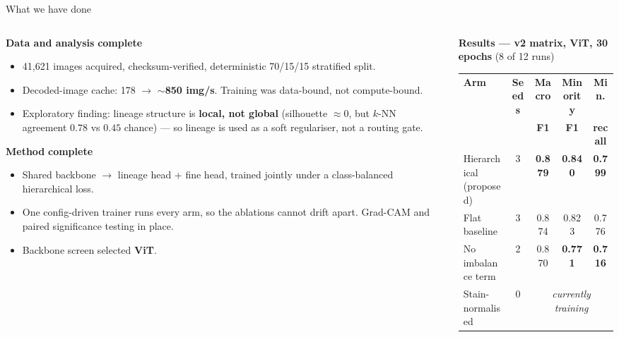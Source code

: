 \documentclass[aspectratio=169,11pt]{beamer}
\newcommand{\good}[1]{\textcolor{green!45!black}{\textbf{#1}}}
\newcommand{\bad}[1]{\textcolor{red!70!black}{\textbf{#1}}}
\begin{document}
\begin{frame}{What we have done}
  \begin{columns}[T]
    \begin{column}{0.47\textwidth}
      \scriptsize
      \textbf{Data and analysis} \good{complete}
      \begin{itemize}\setlength{\itemsep}{0.15em}
        \item 41,621 images acquired, checksum-verified, deterministic
          70/15/15 stratified split.
        \item Decoded-image cache: 178 $\rightarrow$ \good{$\sim$850 img/s}.
          Training was data-bound, not compute-bound.
        \item Exploratory finding: lineage structure is \textbf{local, not
          global} (silhouette $\approx 0$, but $k$-NN agreement $0.78$ vs
          $0.45$ chance) --- so lineage is used as a soft regulariser, not a
          routing gate.
      \end{itemize}

      \smallskip
      \textbf{Method} \good{complete}
      \begin{itemize}\setlength{\itemsep}{0.15em}
        \item Shared backbone $\rightarrow$ lineage head + fine head, trained
          jointly under a class-balanced hierarchical loss.
        \item One config-driven trainer runs every arm, so the ablations cannot
          drift apart. Grad-CAM and paired significance testing in place.
        \item Backbone screen selected \textbf{ViT}.
      \end{itemize}
    \end{column}
    \begin{column}{0.51\textwidth}
      \scriptsize
      \textbf{Results --- v2 matrix, ViT, 30 epochs} (8 of 12 runs)
      \smallskip

      \begin{tabular}{@{}lcccc@{}}
        \toprule
        \textbf{Arm} & \textbf{Seeds} & \textbf{Macro} & \textbf{Minority} & \textbf{Min.} \\
                     &                & \textbf{F1}    & \textbf{F1}       & \textbf{recall} \\
        \midrule
        Hierarchical (proposed) & 3 & \good{0.879} & \good{0.840} & \good{0.799} \\
        Flat baseline           & 3 & 0.874 & 0.823 & 0.776 \\
        No imbalance term       & 2 & 0.870 & \bad{0.771} & \bad{0.716} \\
        Stain-normalised        & 0 & \multicolumn{3}{c}{\emph{currently training}} \\
        \bottomrule
      \end{tabular}


\end{column}
\end{columns}
\end{frame}
\end{document}
